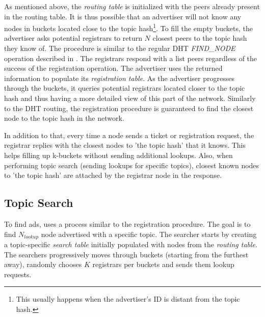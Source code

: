As mentioned above, the \emph{routing table} is initialized with the peers already present in the routing table. It is thus possible that an advertiser will not know any nodes in buckets located close to the topic hash\footnote{This usually happens when the advertiser's ID is distant from the topic hash.}. 
To fill the empty buckets, the advertiser asks potential registrars to return $N$ closest peers to the topic hash they know of. 
The procedure is similar to the regular DHT \emph{FIND\_NODE} operation described in . 
The registrars respond with a list peers regardless of the success of the registration operation. 
The advertiser uses the returned information to populate its \emph{registration table}. 
As the advertiser progresses through the buckets, it queries potential registrars located closer to the topic hash and thus having a more detailed view of this part of the network. 
Similarly to the DHT routing, the registration procedure is guaranteed to find the closest node to the topic hash in the network. 



In addition to that, every time a node sends a ticket or registration request, the registrar replies with the closest nodes to 'the topic hash' that it knows. 
This helps filling up k-buckets without sending additional lookups. 
Also, when performing topic search (sending lookups for specific topics),  closest known nodes to 'the topic hash' are attached by the registrar node in the response.




\subsection{Topic Search}\label{sec:lookup}
To find ads, \sysname uses a process similar to the registration procedure. 
The goal is to find $N_\textit{lookup}$ node advertised with a specific topic. 
The searcher starts by creating a topic-specific \emph{search table} initially populated with nodes from the \emph{routing table}. 
The searchers progressively moves through buckets (starting from the furthest away), randomly chooses $K$ registrars per buckets and sends them lookup requests. 



